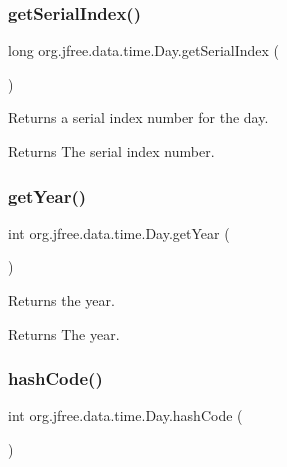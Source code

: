 \subsubsection{\texorpdfstring{get\+Serial\+Index()}{getSerialIndex()}}
{\footnotesize\ttfamily long org.\+jfree.\+data.\+time.\+Day.\+get\+Serial\+Index (\begin{DoxyParamCaption}{ }\end{DoxyParamCaption})}

Returns a serial index number for the day.

\begin{DoxyReturn}{Returns}
The serial index number. 
\end{DoxyReturn}
\mbox{\label{classorg_1_1jfree_1_1data_1_1time_1_1_day_a64d1004dbdd56010b7563048a069015a}} 
\subsubsection{\texorpdfstring{get\+Year()}{getYear()}}
{\footnotesize\ttfamily int org.\+jfree.\+data.\+time.\+Day.\+get\+Year (\begin{DoxyParamCaption}{ }\end{DoxyParamCaption})}

Returns the year.

\begin{DoxyReturn}{Returns}
The year. 
\end{DoxyReturn}
\mbox{\label{classorg_1_1jfree_1_1data_1_1time_1_1_day_ae130884de4d0caea794ea51de6a3acbb}} 
\subsubsection{\texorpdfstring{hash\+Code()}{hashCode()}}
{\footnotesize\ttfamily int org.\+jfree.\+data.\+time.\+Day.\+hash\+Code (\begin{DoxyParamCaption}{ }\end{DoxyParamCaption})}

